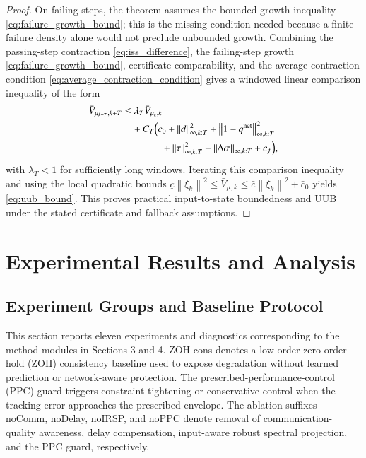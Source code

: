 \documentclass[twocolumn,3p,times,procedia]{elsarticle}
\newcommand{\ZOHcons}{ZOH-cons}
\newcommand{\norm}[1]{\left\lVert #1 \right\rVert}
\begin{document}
\begin{proof}
On failing steps, the theorem assumes the bounded-growth inequality \eqref{eq:failure_growth_bound}; this is the missing condition needed because a finite failure density alone would not preclude unbounded growth. Combining the passing-step contraction \eqref{eq:iss_difference}, the failing-step growth \eqref{eq:failure_growth_bound}, certificate comparability, and the average contraction condition \eqref{eq:average_contraction_condition} gives a windowed linear comparison inequality of the form
\begin{equation}
\begin{aligned}
\bar V_{\mu_{k+T},k+T}
&\le \lambda_T\bar V_{\mu_k,k}\\
&\quad +C_T\Bigl(c_0+\norm{d}_{\infty,k:T}^2
+\norm{1-q^{\mathrm{net}}}_{\infty,k:T}^2\\
&\qquad\qquad
+\norm{\tau}_{\infty,k:T}^2
+\norm{\Delta\sigma}_{\infty,k:T}+c_f\Bigr),
\end{aligned}
\label{eq:window_comparison}
\end{equation}
with $\lambda_T<1$ for sufficiently long windows. Iterating this comparison inequality and using the local quadratic bounds
$\underline c\norm{\xi_k}^2\le\bar V_{\mu,k}\le\bar c\norm{\xi_k}^2+\bar c_0$ yields \eqref{eq:uub_bound}. This proves practical input-to-state boundedness and UUB under the stated certificate and fallback assumptions.
\end{proof}


\section{Experimental Results and Analysis}

\subsection{Experiment Groups and Baseline Protocol}

This section reports eleven experiments and diagnostics corresponding to the method modules in Sections 3 and 4. \ZOHcons{} denotes a low-order zero-order-hold (ZOH) consistency baseline used to expose degradation without learned prediction or network-aware protection. The prescribed-performance-control (PPC) guard triggers constraint tightening or conservative control when the tracking error approaches the prescribed envelope. The ablation suffixes noComm, noDelay, noIRSP, and noPPC denote removal of communication-quality awareness, delay compensation, input-aware robust spectral projection, and the PPC guard, respectively.
\end{document}
